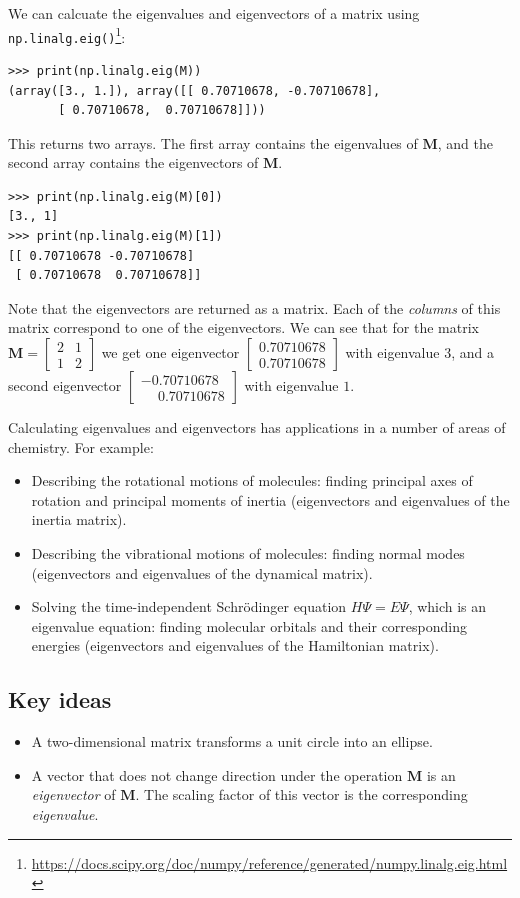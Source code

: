 \documentclass[a4paper]{article}
\newcommand{\bvec}[1]{\boldsymbol{\mathbf{#1}}}
\newcommand{\cvec}[2]{\begin{bmatrix}#1\\#2\end{bmatrix}}
\newcommand{\tmatrix}[4]{\begin{bmatrix}#1&#2\\#3&#4\end{bmatrix}}
\begin{document}
We can calcuate the eigenvalues and eigenvectors of a matrix using \texttt{np.linalg.eig()}\footnote{\url{https://docs.scipy.org/doc/numpy/reference/generated/numpy.linalg.eig.html}}:
\begin{lstlisting}
>>> print(np.linalg.eig(M))
(array([3., 1.]), array([[ 0.70710678, -0.70710678],
       [ 0.70710678,  0.70710678]]))
\end{lstlisting}
This returns two arrays. The first array contains the eigenvalues of $\bvec{M}$, and the second array contains the eigenvectors of $\bvec{M}$.
\begin{lstlisting}
>>> print(np.linalg.eig(M)[0])
[3., 1]
>>> print(np.linalg.eig(M)[1])
[[ 0.70710678 -0.70710678]
 [ 0.70710678  0.70710678]]
\end{lstlisting}
Note that the eigenvectors are returned as a matrix. Each of the \emph{columns} of this matrix correspond to one of the eigenvectors. We can see that for the matrix $\bvec{M}=\tmatrix{2}{1}{1}{2}$ we get one eigenvector $\cvec{0.70710678}{0.70710678}$ with eigenvalue $3$, and a second eigenvector $\cvec{-0.70710678}{\phantom{-}0.70710678}$ with eigenvalue $1$.

Calculating eigenvalues and eigenvectors has applications in a number of areas of chemistry. For example:
\begin{itemize}
 \item Describing the rotational motions of molecules: finding principal axes of rotation and principal moments of inertia (eigenvectors and eigenvalues of the inertia matrix).
 \item Describing the vibrational motions of molecules: finding normal modes (eigenvectors and eigenvalues of the dynamical matrix).
 \item Solving the time-independent Schr\"{o}dinger equation $H\Psi=E\Psi$, which is an eigenvalue equation: finding molecular orbitals and their corresponding energies (eigenvectors and eigenvalues of the Hamiltonian matrix).
\end{itemize}

\subsection{Key ideas}
\begin{itemize}
  \item A two-dimensional matrix transforms a unit circle into an ellipse.
  \item A vector that does not change direction under the operation $\bvec{M}$ is an \emph{eigenvector} of $\bvec{M}$. The scaling factor of this vector is the corresponding \emph{eigenvalue}.
\end{itemize}
\end{document}
